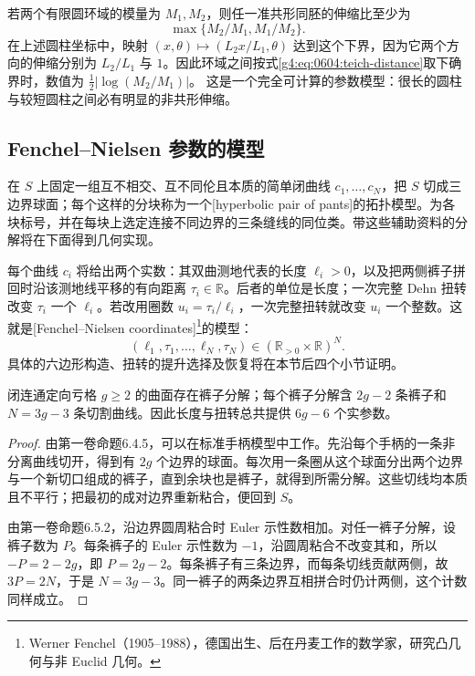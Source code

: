\begin{example}
	\label{g4:exm:0604:annulus-distortion}
	若两个有限圆环域的模量为 \(M_1,M_2\)，则任一准共形同胚的伸缩比至少为
	\[
		\max\{M_2/M_1,M_1/M_2\}.
	\]
	在上述圆柱坐标中，映射
	\((x,\theta)\mapsto(L_2x/L_1,\theta)\)
	达到这个下界，因为它两个方向的伸缩分别为 \(L_2/L_1\) 与 \(1\)。因此环域之间按式\eqref{g4:eq:0604:teich-distance}取下确界时，数值为
	\(\tfrac12|\log(M_2/M_1)|\)。
	这是一个完全可计算的参数模型：很长的圆柱与较短圆柱之间必有明显的非共形伸缩。
\end{example}

\subsection{Fenchel–Nielsen 参数的模型}
\label{g4:subsec:0604:03}

在 \(S\) 上固定一组互不相交、互不同伦且本质的简单闭曲线 \(c_1,\ldots,c_N\)，把 \(S\) 切成三边界球面；每个这样的分块称为一个[hyperbolic pair of pants]的拓扑模型。为各块标号，并在每块上选定连接不同边界的三条缝线的同位类。带这些辅助资料的分解将在下面得到几何实现。

\ProseParagraphBreak

每个曲线 \(c_i\) 将给出两个实数：其双曲测地代表的长度 \(\ell_i>0\)，以及把两侧裤子拼回时沿该测地线平移的有向距离 \(\tau_i\in\mathbb R\)。后者的单位是长度；一次完整 Dehn 扭转改变 \(\tau_i\) 一个 \(\ell_i\)。若改用圈数 \(u_i=\tau_i/\ell_i\)，一次完整扭转就改变 \(u_i\) 一个整数。这就是[Fenchel--Nielsen coordinates]\footnote{Werner Fenchel（1905--1988），德国出生、后在丹麦工作的数学家，研究凸几何与非 Euclid 几何。}的模型：
\[
	(\ell_1,\tau_1,\ldots,\ell_N,\tau_N)
	\in(\mathbb R_{>0}\times\mathbb R)^N.
\]
具体的六边形构造、扭转的提升选择及恢复将在本节后四个小节证明。

\begin{proposition}
	\label{g4:prop:0604:pants-count}
	闭连通定向亏格 \(g\ge2\) 的曲面存在裤子分解；每个裤子分解含 \(2g-2\) 条裤子和 \(N=3g-3\) 条切割曲线。因此长度与扭转总共提供 \(6g-6\) 个实参数。
\end{proposition}
\begin{proof}
	由第一卷命题6.4.5，可以在标准手柄模型中工作。先沿每个手柄的一条非分离曲线切开，得到有 \(2g\) 个边界的球面。每次用一条圈从这个球面分出两个边界与一个新切口组成的裤子，直到余块也是裤子，就得到所需分解。这些切线均本质且不平行；把最初的成对边界重新粘合，便回到 \(S\)。

	由第一卷命题6.5.2，沿边界圆周粘合时 Euler 示性数相加。对任一裤子分解，设裤子数为 \(P\)。每条裤子的 Euler 示性数为 \(-1\)，沿圆周粘合不改变其和，所以 \(-P=2-2g\)，即 \(P=2g-2\)。每条裤子有三条边界，而每条切线贡献两侧，故 \(3P=2N\)，于是 \(N=3g-3\)。同一裤子的两条边界互相拼合时仍计两侧，这个计数同样成立。
\end{proof}

